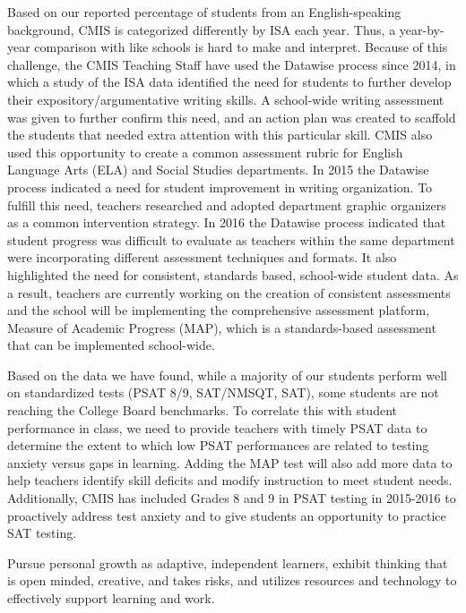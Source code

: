 Based on our reported percentage of students from an English-speaking background, CMIS is categorized differently by ISA each year. Thus, a year-by-year comparison with like schools is hard to make and interpret. Because of this challenge, the CMIS Teaching Staff have used the Datawise process since 2014, in which a study of the ISA data identified the need for students to further develop their expository/argumentative writing skills.  A school-wide writing assessment was given to further confirm this need, and an action plan was created to scaffold the students that needed extra attention with this particular skill. CMIS also used this opportunity to create a common assessment rubric for English Language Arts (ELA) and Social Studies departments. In 2015 the Datawise process indicated a need for student improvement in writing organization. To fulfill this need, teachers researched and adopted department graphic organizers as a common intervention strategy. In 2016 the Datawise process indicated that student progress was difficult to evaluate as teachers within the same department were incorporating different assessment techniques and formats. It also highlighted the need for consistent, standards based, school-wide student data. As a result, teachers are currently working on the creation of consistent assessments and the school will be implementing the comprehensive assessment platform, Measure of Academic Progress (MAP), which is a standards-based assessment that can be implemented school-wide.

Based on the data we have found, while a majority of our students perform well on standardized tests (PSAT 8/9, SAT/NMSQT, SAT), some students are not reaching the College Board benchmarks. To correlate this with student performance in class, we need to provide teachers with timely PSAT data to determine the extent to which low PSAT performances are related to testing anxiety versus gaps in learning. Adding the MAP test will also add more data to help teachers identify skill deficits and modify instruction to meet student needs. Additionally, CMIS has included Grades 8 and 9 in PSAT testing in 2015-2016 to proactively address test anxiety and to give students an opportunity to practice SAT testing. 


Pursue personal growth as adaptive, independent learners, exhibit thinking that is open minded, creative, and takes risks, and utilizes resources and technology to effectively support learning and work.

